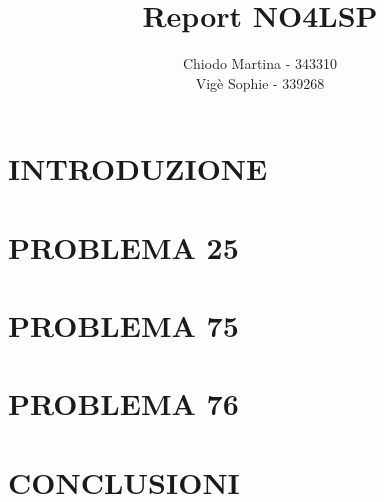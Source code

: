 \documentclass{article}
\title{Report NO4LSP}
\author{Chiodo Martina - 343310 \\ Vigè Sophie - 339268}
\date{}
\begin{document}
%



\section*{INTRODUZIONE}


\newpage
\section*{PROBLEMA 25}


\newpage
\section*{PROBLEMA 75}


\newpage
\section*{PROBLEMA 76}


\newpage
\section*{CONCLUSIONI}

\end{document}
